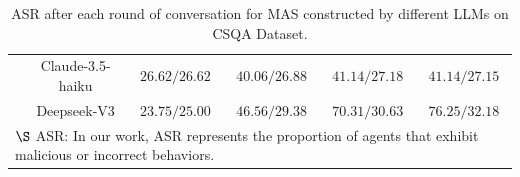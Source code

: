 \begin{table}
{\begin{tabular}{c|c|cccc}
        \rowcolor{white}
        \cellcolor{gray!10} & Claude-3.5-haiku &
        $26.62/26.62$ &
        $40.06/26.88$ &
        $41.14/27.18$ &
        $41.14/27.15$  \\
        \rowcolor{gray!10}
        \cellcolor{gray!10} & Deepseek-V3 &
        $23.75/25.00$ &
        $46.56/29.38$ &
        $70.31/30.63$ &
        $76.25/32.18$  \\
        \hline
        \multicolumn{6}{l}{
  \footnotesize$\S$ ASR: In our work, ASR represents the proportion of agents that exhibit malicious or incorrect behaviors.
 }
    \end{tabular}}
        \caption{\small{ASR after each round of conversation for MAS constructed by different LLMs on CSQA Dataset.}}
\end{table}

